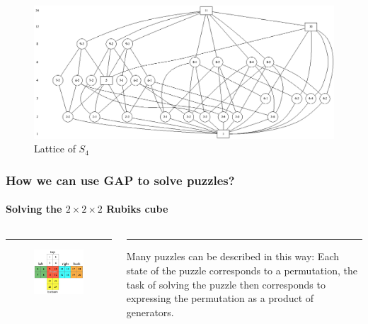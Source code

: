 \documentclass{beamer}
\theoremstyle{definition}
\theoremstyle{remark}
\begin{document}
\begin{frame}[fragile]
\begin{figure}
	\centering
	\includegraphics[width=1.0\linewidth]{output}
	\caption{Lattice of $S_4$}
	\label{S4}
\end{figure}

\end{frame}



\begin{frame}
	\frametitle{How we can use GAP to solve puzzles?}
	\framesubtitle{Solving the $ 2 \times 2 \times 2 $ Rubiks cube}
	\begin{columns}[T] %
		\begin{column}{.48\textwidth}
			\color{red}\rule{\linewidth}{4pt}
			\begin{figure}
				\includegraphics[scale=0.4]{Rubik}
			\end{figure}
		\end{column}%
		\hfill%
		\begin{column}{.48\textwidth}
			\color{blue}\rule{\linewidth}{4pt}
			\centering Many puzzles can be described in this way: Each state of the puzzle corresponds to a
			permutation, the task of solving the puzzle then corresponds to expressing the permutation as a
			product of generators.
		\end{column}%
	\end{columns}
\end{frame}
\end{document}
